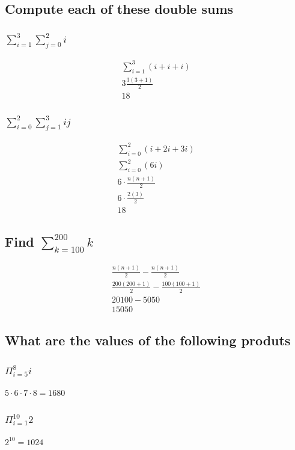 \documentclass[12pt, a4paper]{report}
\begin{document}
				\subsection{Compute each of these double sums}
					\setcounter{subsubsection}{2}
					\subsubsection{$\sum\limits_{i=1}^3\sum\limits_{j=0}^2i$}
						\begin{align*}
							\sum\limits_{i=1}^3(i+i+i)\\
							3\frac{3(3+1)}{2}\\
							18
						\end{align*}
					\subsubsection{$\sum\limits_{i=0}^2\sum\limits_{j=1}^3ij$}
						\begin{align*}	
							\sum\limits_{i=0}^2(i+2i+3i)\\
							\sum\limits_{i=0}^2(6i)\\
							6\cdot \frac{n(n+1)}{2}\\
							6\cdot \frac{2(3)}{2}\\
							18
						\end{align*}
				\setcounter{subsection}{38}
				\subsection{Find $\sum\limits_{k=100}^{200}k$}
					\begin{align*}
						\frac{n(n+1)}{2}-\frac{n(n+1)}{2}\\
						\frac{200(200+1)}{2}-\frac{100(100+1)}{2}\\
						20100-5050\\
						15050
					\end{align*}
				\setcounter{subsection}{44}
				\subsection{What are the values of the following produts}
					\setcounter{subsubsection}{1}
					\subsubsection{$\Pi_{i=5}^8i$}
						$5\cdot 6\cdot 7\cdot 8=1680$
					\setcounter{subsubsection}{3}
					\subsubsection{$\Pi_{i=1}^{10}2$}
							$2^{10}=1024$
\end{document}
